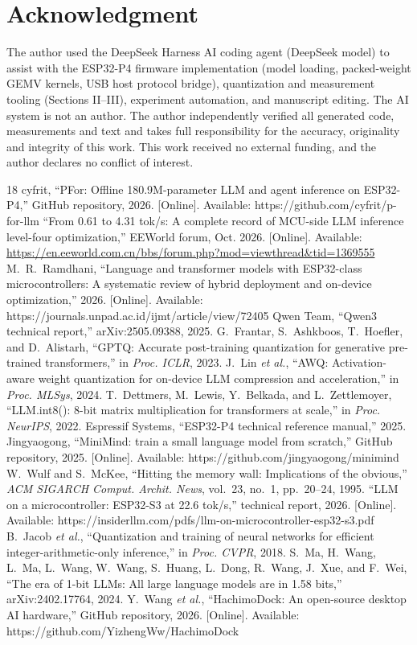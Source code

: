 \documentclass[journal,letterpaper]{IEEEtran}
\begin{document}
\section*{Acknowledgment}
The author used the DeepSeek Harness AI coding agent (DeepSeek model) to assist with the
ESP32-P4 firmware implementation (model loading, packed-weight GEMV kernels, USB host protocol
bridge), quantization and measurement tooling (Sections II--III), experiment automation, and
manuscript editing. The AI system is not an author. The author independently verified all
generated code, measurements and text and takes full responsibility for the accuracy,
originality and integrity of this work. This work received no external funding, and the author
declares no conflict of interest.

\begin{thebibliography}{18}
 cyfrit, ``PFor: Offline 180.9M-parameter LLM and agent inference on ESP32-P4,'' GitHub repository, 2026. [Online]. Available: https://github.com/cyfrit/p-for-llm
 ``From 0.61 to 4.31 tok/s: A complete record of MCU-side LLM inference level-four optimization,'' EEWorld forum, Oct. 2026. [Online]. Available: \url{https://en.eeworld.com.cn/bbs/forum.php?mod=viewthread&tid=1369555}
 M.~R.~Ramdhani, ``Language and transformer models with ESP32-class microcontrollers: A systematic review of hybrid deployment and on-device optimization,'' 2026. [Online]. Available: https://journals.unpad.ac.id/ijmt/article/view/72405
 Qwen Team, ``Qwen3 technical report,'' arXiv:2505.09388, 2025.
 G.~Frantar, S.~Ashkboos, T.~Hoefler, and D.~Alistarh, ``GPTQ: Accurate post-training quantization for generative pre-trained transformers,'' in \emph{Proc. ICLR}, 2023.
 J.~Lin \emph{et al.}, ``AWQ: Activation-aware weight quantization for on-device LLM compression and acceleration,'' in \emph{Proc. MLSys}, 2024.
 T.~Dettmers, M.~Lewis, Y.~Belkada, and L.~Zettlemoyer, ``LLM.int8(): 8-bit matrix multiplication for transformers at scale,'' in \emph{Proc. NeurIPS}, 2022.
 Espressif Systems, ``ESP32-P4 technical reference manual,'' 2025.
 Jingyaogong, ``MiniMind: train a small language model from scratch,'' GitHub repository, 2025. [Online]. Available: https://github.com/jingyaogong/minimind
 W.~Wulf and S.~McKee, ``Hitting the memory wall: Implications of the obvious,'' \emph{ACM SIGARCH Comput. Archit. News}, vol.~23, no.~1, pp.~20--24, 1995.
 ``LLM on a microcontroller: ESP32-S3 at 22.6 tok/s,'' technical report, 2026. [Online]. Available: https://insiderllm.com/pdfs/llm-on-microcontroller-esp32-s3.pdf
 B.~Jacob \emph{et al.}, ``Quantization and training of neural networks for efficient integer-arithmetic-only inference,'' in \emph{Proc. CVPR}, 2018.
 S.~Ma, H.~Wang, L.~Ma, L.~Wang, W.~Wang, S.~Huang, L.~Dong, R.~Wang, J.~Xue, and F.~Wei, ``The era of 1-bit LLMs: All large language models are in 1.58 bits,'' arXiv:2402.17764, 2024.
 Y.~Wang \emph{et al.}, ``HachimoDock: An open-source desktop AI hardware,'' GitHub repository, 2026. [Online]. Available: https://github.com/YizhengWw/HachimoDock
\end{thebibliography}
\end{document}
